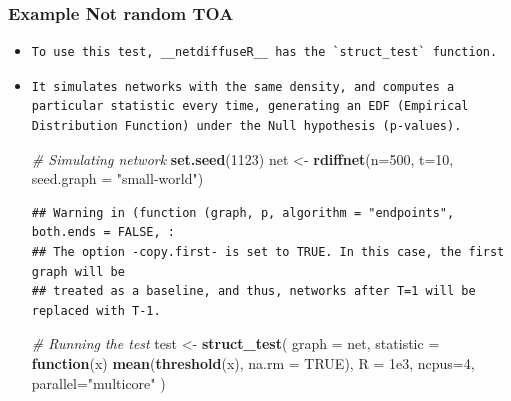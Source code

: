 \documentclass[
]{book}
\newenvironment{Shaded}{\begin{snugshade}}{\end{snugshade}}
\newcommand{\AttributeTok}[1]{\textcolor[rgb]{0.13,0.29,0.53}{#1}}
\newcommand{\CommentTok}[1]{\textcolor[rgb]{0.56,0.35,0.01}{\textit{#1}}}
\newcommand{\ConstantTok}[1]{\textcolor[rgb]{0.56,0.35,0.01}{#1}}
\newcommand{\ControlFlowTok}[1]{\textcolor[rgb]{0.13,0.29,0.53}{\textbf{#1}}}
\newcommand{\DecValTok}[1]{\textcolor[rgb]{0.00,0.00,0.81}{#1}}
\newcommand{\FloatTok}[1]{\textcolor[rgb]{0.00,0.00,0.81}{#1}}
\newcommand{\FunctionTok}[1]{\textcolor[rgb]{0.13,0.29,0.53}{\textbf{#1}}}
\newcommand{\NormalTok}[1]{#1}
\newcommand{\OtherTok}[1]{\textcolor[rgb]{0.56,0.35,0.01}{#1}}
\newcommand{\StringTok}[1]{\textcolor[rgb]{0.31,0.60,0.02}{#1}}
\begin{document}
\hypertarget{example-not-random-toa}{%
\subsubsection{Example Not random TOA}\label{example-not-random-toa}}

\begin{itemize}
\item
\begin{verbatim}
To use this test, __netdiffuseR__ has the `struct_test` function.
\end{verbatim}
\item
\begin{verbatim}
It simulates networks with the same density, and computes a particular statistic every time, generating an EDF (Empirical Distribution Function) under the Null hypothesis (p-values).
\end{verbatim}

\begin{Shaded}
\begin{Highlighting}[]
\CommentTok{\# Simulating network}
\FunctionTok{set.seed}\NormalTok{(}\DecValTok{1123}\NormalTok{)}
\NormalTok{net }\OtherTok{\textless{}{-}} \FunctionTok{rdiffnet}\NormalTok{(}\AttributeTok{n=}\DecValTok{500}\NormalTok{, }\AttributeTok{t=}\DecValTok{10}\NormalTok{, }\AttributeTok{seed.graph =} \StringTok{"small{-}world"}\NormalTok{)}
\end{Highlighting}
\end{Shaded}

\begin{verbatim}
## Warning in (function (graph, p, algorithm = "endpoints", both.ends = FALSE, :
## The option -copy.first- is set to TRUE. In this case, the first graph will be
## treated as a baseline, and thus, networks after T=1 will be replaced with T-1.
\end{verbatim}

\begin{Shaded}
\begin{Highlighting}[]
\CommentTok{\# Running the test}
\NormalTok{test }\OtherTok{\textless{}{-}} \FunctionTok{struct\_test}\NormalTok{(}
  \AttributeTok{graph     =}\NormalTok{ net, }
  \AttributeTok{statistic =} \ControlFlowTok{function}\NormalTok{(x) }\FunctionTok{mean}\NormalTok{(}\FunctionTok{threshold}\NormalTok{(x), }\AttributeTok{na.rm =} \ConstantTok{TRUE}\NormalTok{),}
  \AttributeTok{R         =} \FloatTok{1e3}\NormalTok{,}
  \AttributeTok{ncpus=}\DecValTok{4}\NormalTok{, }\AttributeTok{parallel=}\StringTok{"multicore"}
\NormalTok{  )}
\end{Highlighting}
\end{Shaded}


\end{itemize}
\end{document}
